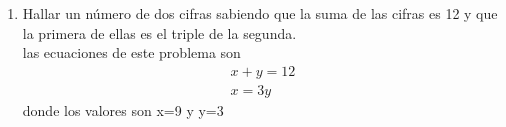 \documentclass[12pt,letterpaper]{report}
\begin{document}
\begin{enumerate}
    las ecuaciones de este problema son las siguientes:
    \begin{equation*}
        \begin{matrix}
            32x+50y=14600\\ 10x+40y=7000
        \end{matrix}
    \end{equation*}
    por lo que las respuestas son x=300 y Y=100
    \item Hallar un número de dos cifras sabiendo que la suma de las cifras es 12 y que la primera de ellas es el triple de la segunda.\\
    las ecuaciones de este problema son\begin{equation*}
        \begin{matrix}
            x+y=12 \\ x=3y
        \end{matrix}
    \end{equation*}
    donde los valores son x=9 y y=3
\end{enumerate}
\end{document}

